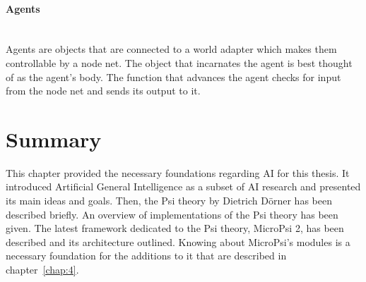            \paragraph{Agents}$\;$ \\
Agents are objects that are connected to a world adapter which makes them controllable by a node net. The object that incarnates the agent is best thought of as the agent's body. The function that advances the agent checks for input from the node net and sends its output to it.
        
    \section{Summary}
This chapter provided the necessary foundations regarding AI for this thesis. It introduced Artificial General Intelligence as a subset of AI research and presented its main ideas and goals. Then, the Psi theory by Dietrich Dörner has been described briefly. An overview of implementations of the Psi theory has been given. The latest framework dedicated to the Psi theory, MicroPsi 2, has been described and its architecture outlined. Knowing about MicroPsi's modules is a necessary foundation for the additions to it that are described in chapter~\ref{chap:4}.